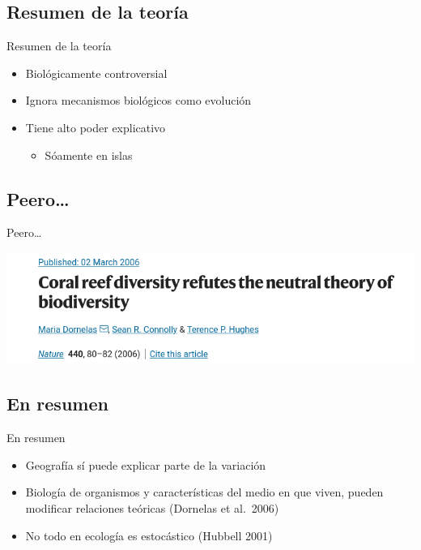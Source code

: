 \documentclass[
  11pt,
  ignorenonframetext,
]{beamer}
\providecommand{\tightlist}{%
  \setlength{\itemsep}{0pt}\setlength{\parskip}{0pt}}
\begin{document}
\hypertarget{resumen-de-la-teoruxeda}{%
\subsection{Resumen de la teoría}\label{resumen-de-la-teoruxeda}}

\begin{frame}{Resumen de la teoría}
\begin{itemize}
\item
  Biológicamente controversial
\item
  Ignora mecanismos biológicos como evolución
\item
  Tiene alto poder explicativo

  \begin{itemize}
  \tightlist
  \item
    Sóamente en islas
  \end{itemize}
\end{itemize}
\end{frame}

\hypertarget{peero}{%
\subsection{Peero\ldots{}}\label{peero}}

\begin{frame}{Peero\ldots{}}
\begin{center}\includegraphics{Biogeografia/Connolly} \end{center}
\end{frame}

\hypertarget{en-resumen}{%
\subsection{En resumen}\label{en-resumen}}

\begin{frame}{En resumen}
\begin{itemize}
\item
  Geografía sí puede explicar parte de la variación
\item
  Biología de organismos y características del medio en que viven,
  pueden modificar relaciones teóricas (Dornelas et al.~2006)
\item
  No todo en ecología es estocástico (Hubbell 2001)
\end{itemize}
\end{frame}
\end{document}
